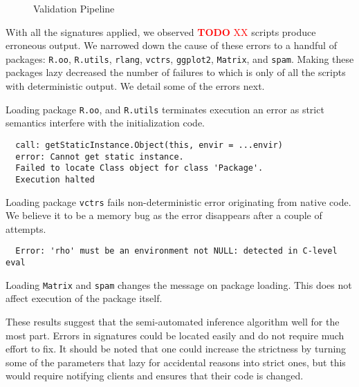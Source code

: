 \documentclass[screen,acmsmall]{acmart}
\newcommand{\authorcomment}[3]{\xspace\textcolor{#1}{{\bf #2} #3}\xspace}
\newcommand{\todo}[1]{\authorcomment{red}{TODO}{#1}}
\newcommand{\code}[1]{\lstinline |#1|\xspace}
\begin{document}
\begin{figure}[H]
{
  }
  \caption{Validation Pipeline}\label{fig:validationPipeline}
\end{figure}


With all the signatures applied, we observed \todo{XX} scripts produce erroneous
output. We narrowed down the cause of these errors to a handful of packages:
\code{R.oo}, \code{R.utils}, \code{rlang}, \code{vctrs}, \code{ggplot2},
\code{Matrix}, and \code{spam}. Making these packages lazy decreased the number
of failures to \ValidationStrictFailedProgramCount which is only
\ValidationStrictFailedProgramPerc of all the scripts with deterministic output.
We detail some of the errors next.

Loading package \code{R.oo}, and \code{R.utils} terminates execution an error as
strict semantics interfere with the initialization code.

\begin{verbatim}
  call: getStaticInstance.Object(this, envir = ...envir)
  error: Cannot get static instance.
  Failed to locate Class object for class 'Package'.
  Execution halted
\end{verbatim}

Loading package \code{vctrs} fails non-deterministic error originating from
native code. We believe it to be a memory bug as the error disappears after
a couple of attempts.

\begin{verbatim}
  Error: 'rho' must be an environment not NULL: detected in C-level eval
\end{verbatim}

Loading \code{Matrix} and \code{spam} changes the message on package loading.
This does not affect execution of the package itself.

These results suggest that the semi-automated inference algorithm well for the
most part. Errors in signatures could be located easily and do not require much
effort to fix. It should be noted that one could increase the strictness by
turning some of the parameters that lazy for accidental reasons into strict
ones, but this would require notifying clients and ensures that their code is
changed.
\end{document}
